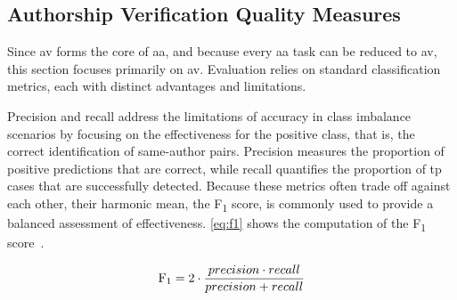 \subsection{Authorship Verification Quality Measures}
\label{subsec:av_quality_measures}

Since \ac{av} forms the core of \ac{aa}, and because every \ac{aa} task can be reduced to \ac{av}, this section focuses primarily on \ac{av}. 
Evaluation relies on standard classification metrics, each with distinct advantages and limitations.



Precision and recall address the limitations of accuracy in class imbalance scenarios by focusing on the effectiveness for the positive class, that is, the correct identification of same-author pairs. 
Precision measures the proportion of positive predictions that are correct, while recall quantifies the proportion of \ac{tp} cases that are successfully detected. 
Because these metrics often trade off against each other, their harmonic mean, the F\textsubscript{1} score, is commonly used to provide a balanced assessment of effectiveness. 
\autoref{eq:f1} shows the computation of the F\textsubscript{1} score~\citep{neal_surveying_2018}.

\begin{equation}\label{eq:f1}
     \text{F\textsubscript{1}} = 2 \cdot \frac{precision \cdot recall}{precision + recall}
\end{equation}

